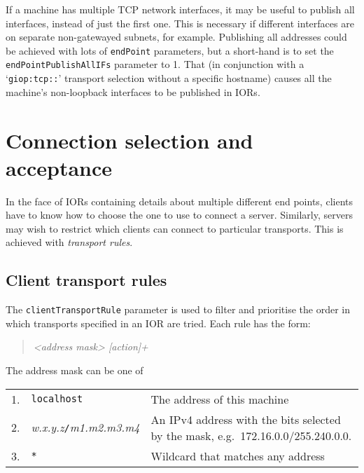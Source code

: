 \documentclass[draft,11pt,twoside,a4paper]{book}
\newcommand{\code}[1]{\texttt{#1}}
\newcommand{\term}[1]{\textit{#1}}
\begin{document}
If a machine has multiple TCP network interfaces, it may be useful to
publish all interfaces, instead of just the first one. This is
necessary if different interfaces are on separate non-gatewayed
subnets, for example. Publishing all addresses could be achieved with
lots of \code{endPoint} parameters, but a short-hand is to set the
\code{endPointPublishAllIFs} parameter to 1. That (in conjunction with
a `\code{giop:tcp::}' transport selection without a specific hostname)
causes all the machine's non-loopback interfaces to be published in
IORs.



\section{Connection selection and acceptance}

In the face of IORs containing details about multiple different end
points, clients have to know how to choose the one to use to connect a
server. Similarly, servers may wish to restrict which clients can
connect to particular transports. This is achieved with
\term{transport rules}.


\subsection{Client transport rules}
\label{sec:clientRule}

The \code{clientTransportRule} parameter is used to filter and
prioritise the order in which transports specified in an IOR are
tried. Each rule has the form:

\begin{quote}
\textit{<address mask> [action]+}
\end{quote}

\noindent The address mask can be one of

\vspace{\baselineskip}

\begin{tabular}{llp{}}
1. & \code{localhost} & The address of this machine\\

2. & \textit{w.x.y.z}\code{/}\textit{m1.m2.m3.m4} & An IPv4 address
     with the bits selected by the mask, e.g.\
     172.16.0.0/255.240.0.0.\\

3. & \code{*} & Wildcard that matches any address\\
\end{tabular}
\end{document}
